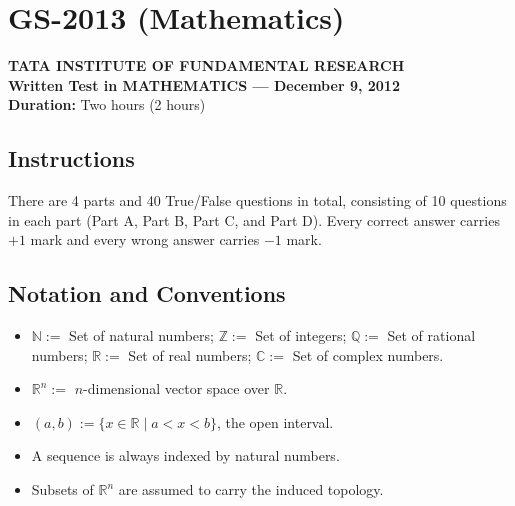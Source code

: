\documentclass[11pt, a4paper]{article}
\begin{document}
\section{GS-2013 (Mathematics)}

\begin{center}
  \textbf{TATA INSTITUTE OF FUNDAMENTAL RESEARCH}\\
  \textbf{Written Test in MATHEMATICS --- December 9, 2012}\\
  \textbf{Duration:} Two hours (2 hours)
\end{center}

\subsection*{Instructions}
There are 4 parts and 40 True/False questions in total, consisting of 10 questions in each part (Part A, Part B, Part C, and Part D). Every correct answer carries $+1$ mark and every wrong answer carries $-1$ mark.

\subsection*{Notation and Conventions}
\begin{itemize}
  \item $\mathbb{N} :=$ Set of natural numbers; $\mathbb{Z} :=$ Set of integers; $\mathbb{Q} :=$ Set of rational numbers; $\mathbb{R} :=$ Set of real numbers; $\mathbb{C} :=$ Set of complex numbers.
  \item $\mathbb{R}^n :=$ $n$-dimensional vector space over $\mathbb{R}$.
  \item $(a, b) := \{x \in \mathbb{R} \mid a < x < b\}$, the open interval.
  \item A sequence is always indexed by natural numbers.
  \item Subsets of $\mathbb{R}^n$ are assumed to carry the induced topology.
\end{itemize}
\end{document}
